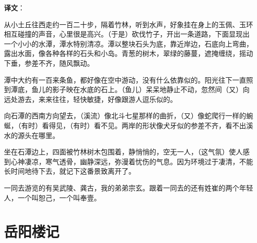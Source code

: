 \documentclass[12pt,UTF-8,openany]{ctexbook}
\begin{document}
\newpage

\textbf{译文}：

\vspace{1em}

\begin{normalsize}
    
    从小土丘往西走约一百二十步，隔着竹林，听到水声，好象挂在身上的玉佩、玉环相互碰撞的声音，心里很是高兴。（于是）砍伐竹子，开出一条道路，下面显现出一个小小的水潭，潭水特别清凉。潭以整块石头为底，靠近岸边，石底向上弯曲，露出水面，像各种各样的石头和小岛。青葱的树木，翠绿的藤蔓，遮掩缠绕，摇动下垂，参差不齐，随风飘动。
    
    潭中大约有一百来条鱼，都好像在空中游动，没有什么依靠似的。阳光往下一直照到潭底，鱼儿的影子映在水底的石上。（鱼儿）呆呆地静止不动，忽然间（又）向远处游去，来来往往，轻快敏捷，好像跟游人逗乐似的。
    
    向石潭的西南方向望去，（溪流）像北斗七星那样的曲折，（又）像蛇爬行一样的蜿蜒，（有时）看得见，（有时）看不见。两岸的形状像犬牙似的参差不齐，看不出溪水的源头在哪里。
    
    坐在石潭边上，四面被竹林树木包围着，静悄悄的，空无一人，（这气氛）使人感到心神凄凉，寒气透骨，幽静深远，弥漫着忧伤的气息。因为环境过于凄清，不能长时间地待下去，就记下这番景致离开了。
    
    一同去游览的有吴武陵、龚古，我的弟弟宗玄。跟着一同去的还有姓崔的两个年轻人，一个叫恕己，一个叫奉壹。
    
\end{normalsize}



\chapter{岳阳楼记}
\end{document}
